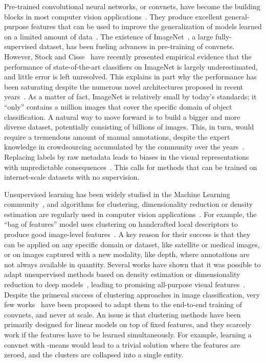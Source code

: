 \documentclass[runningheads]{llncs}
\begin{document}
Pre-trained convolutional neural networks, or convnets, have become the
building blocks in most computer vision
applications~\cite{ren2015faster,chen2016deeplab,weinzaepfel2013deepflow,carreira2016human}.
They produce excellent general-purpose features that can be used to improve the
generalization of models learned on a limited amount of
data~\cite{sharif2014cnn}.  The existence of ImageNet~\cite{deng2009imagenet},
a large fully-supervised dataset, has been fueling advances in pre-training of
convnets.  However, Stock and Cisse~\cite{stock2017convnets} have recently
presented empirical evidence that the performance of state-of-the-art classifiers on
ImageNet is largely underestimated, and little error is left unresolved.  This
explains in part why the performance has been saturating despite the numerous novel
architectures proposed in recent
years~\cite{chen2016deeplab,he2015delving,huang2016densely}.  As a matter of
fact, ImageNet is relatively small by today's standards; it ``only'' contains a
million images that cover the specific domain of object classification.  A
natural way to move forward is to build a bigger and more diverse dataset,
potentially consisting of billions of images.  This, in turn, would require a
tremendous amount of manual annotations, despite the expert knowledge in
crowdsourcing accumulated  by the community over the
years~\cite{kovashka2016crowdsourcing}.  Replacing labels by raw metadata
leads to biases in the visual representations with unpredictable
consequences~\cite{misra2016seeing}.  This calls for methods that can be
trained on internet-scale datasets with no supervision.

Unsupervised learning has been widely studied in the Machine Learning
community~\cite{friedman2001elements}, and algorithms for clustering,
dimensionality reduction or density estimation are regularly used in computer
vision
applications~\cite{turk1991face,shi2000normalized,joulin2010discriminative}.
For example, the ``bag of features'' model uses clustering on handcrafted local
descriptors to produce good image-level features~\cite{csurka2004visual}.  A
key reason for their success is that they can be applied on any specific domain
or dataset, like satellite or medical images, or on images captured with a new
modality, like depth, where annotations are not always available in quantity.
Several works have shown that it was possible to adapt unsupervised methods
based on density estimation or dimensionality reduction to deep
models~\cite{goodfellow2014generative,kingma2013auto}, leading to promising
all-purpose visual
features~\cite{bojanowski2017unsupervised,donahue2016adversarial}.  Despite the
primeval success of clustering approaches in image classification, very few
works~\cite{yang2016joint,xie2016unsupervised} have been proposed to adapt them
to the end-to-end training of convnets, and never at scale.  An issue is that
clustering methods have been primarily designed for linear models on top of
fixed features, and they scarcely work if the features have to be learned
simultaneously.  For example, learning a convnet with -means would lead to a
trivial solution where the features are zeroed, and the clusters are collapsed
into a single entity.
\end{document}
